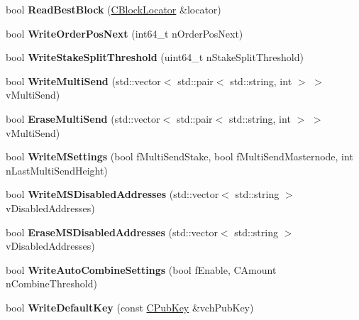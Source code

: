 \begin{DoxyCompactItemize}
bool {\bfseries Read\+Best\+Block} (\mbox{\hyperlink{struct_c_block_locator}{C\+Block\+Locator}} \&locator)
\item 
\mbox{\label{class_c_wallet_d_b_a6a1f671e6376b38a1f73c8a023abdd38}} 
bool {\bfseries Write\+Order\+Pos\+Next} (int64\+\_\+t n\+Order\+Pos\+Next)
\item 
\mbox{\label{class_c_wallet_d_b_a30e68570809d41af56208bbb1af65ee1}} 
bool {\bfseries Write\+Stake\+Split\+Threshold} (uint64\+\_\+t n\+Stake\+Split\+Threshold)
\item 
\mbox{\label{class_c_wallet_d_b_a656f4a9f1b7c0466c794160356b3c2b4}} 
bool {\bfseries Write\+Multi\+Send} (std\+::vector$<$ std\+::pair$<$ std\+::string, int $>$ $>$ v\+Multi\+Send)
\item 
\mbox{\label{class_c_wallet_d_b_a55c05f8ca81afd32d055b5e2e51342e5}} 
bool {\bfseries Erase\+Multi\+Send} (std\+::vector$<$ std\+::pair$<$ std\+::string, int $>$ $>$ v\+Multi\+Send)
\item 
\mbox{\label{class_c_wallet_d_b_a78a239a6bd820854ac22cd15dd80d2c5}} 
bool {\bfseries Write\+M\+Settings} (bool f\+Multi\+Send\+Stake, bool f\+Multi\+Send\+Masternode, int n\+Last\+Multi\+Send\+Height)
\item 
\mbox{\label{class_c_wallet_d_b_a5f80cea3cf5f0e839819ed93ab1c696c}} 
bool {\bfseries Write\+M\+S\+Disabled\+Addresses} (std\+::vector$<$ std\+::string $>$ v\+Disabled\+Addresses)
\item 
\mbox{\label{class_c_wallet_d_b_ad0cdb58cbf268a56e463735b5290bbda}} 
bool {\bfseries Erase\+M\+S\+Disabled\+Addresses} (std\+::vector$<$ std\+::string $>$ v\+Disabled\+Addresses)
\item 
\mbox{\label{class_c_wallet_d_b_a3acb1ee255226519bc613e2c1e572e72}} 
bool {\bfseries Write\+Auto\+Combine\+Settings} (bool f\+Enable, C\+Amount n\+Combine\+Threshold)
\item 
\mbox{\label{class_c_wallet_d_b_a1d925af18104900bddd19c968a0402b5}} 
bool {\bfseries Write\+Default\+Key} (const \mbox{\hyperlink{class_c_pub_key}{C\+Pub\+Key}} \&vch\+Pub\+Key)

\end{DoxyCompactItemize}
